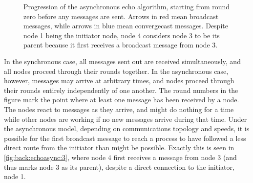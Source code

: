 \begin{figure}[htbp]
    \caption[Progression of the asynchronous \textsf{echo} algorithm]{Progression of the asynchronous \textsf{echo} algorithm, starting from round zero before any messages are sent.  Arrows in red mean broadcast messages, while arrows in blue mean convergecast messages.  Despite node 1 being the initiator node, node 4 considers node 3 to be its parent because it first receives a broadcast message from node 3.}
    \label{fig:back:echoasync}
\end{figure}

In the synchronous case, all messages sent out are received simultaneously, and all nodes proceed through their rounds together.  In the asynchronous case, however, messages may arrive at arbitrary times, and nodes proceed through their rounds entirely independently of one another.  The round numbers in the figure mark the point where at least one message has been received by a node.  The nodes react to messages as they arrive, and might do nothing for a time while other nodes are working if no new messages arrive during that time.  Under the asynchronous model, depending on communications topology and speeds, it is possible for the first broadcast message to reach a process to have followed a less direct route from the initiator than might be possible.  Exactly this is seen in \cref{fig:back:echoasync:3}, where node 4 first receives a message from node 3 (and thus marks node 3 as its parent), despite a direct connection to the initiator, node 1.
